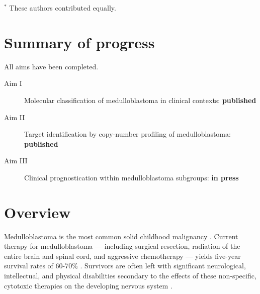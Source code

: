 \documentclass[11pt,letterpaper]{article}
\theoremstyle{definition}
\begin{document}


\clearpage

\bigskip
$^*$ These authors contributed equally.

\clearpage


\clearpage

\section*{Summary of progress}


All aims have been completed.

\begin{description}
	\item[Aim I] Molecular classification of medulloblastoma in clinical contexts: \textbf{published} 
	\item[Aim II] Target identification by copy-number profiling of medulloblastoma: \textbf{published} 
	\item[Aim III] Clinical prognostication within medulloblastoma subgroups: \textbf{in press} 
\end{description}


\listoffigures

\clearpage


\section*{Overview}

Medulloblastoma is the most common solid childhood malignancy . Current therapy for medulloblastoma --- including surgical resection, radiation of the entire brain and spinal cord, and aggressive chemotherapy --- yields five-year survival rates of 60-70\% . Survivors are often left with significant neurological, intellectual, and physical disabilities secondary to the effects of these non-specific, cytotoxic therapies on the developing nervous system .
\end{document}
